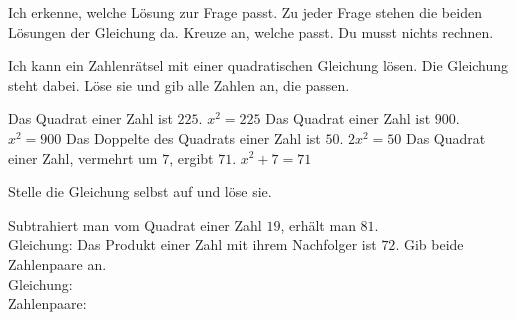 \hypertarget{e3}{}
\renewcommand{\theaufgabe}{\arabic{aufgabe}}\setcounter{aufgabe}{21}

\begin{aufgabe}{Ich erkenne, welche Lösung zur Frage passt. Zu jeder Frage stehen die beiden Lösungen der Gleichung da. Kreuze an, welche passt. Du musst nichts rechnen.}
\begin{geruest}
\end{geruest}
\end{aufgabe}

\begin{aufgabe}{Ich kann ein Zahlenrätsel mit einer quadratischen Gleichung lösen. Die Gleichung steht dabei. Löse sie und gib alle Zahlen an, die passen.}
\begin{teile}
\teil Das Quadrat einer Zahl ist $225$. \quad $x^2 = 225$ \quad {}
\teil Das Quadrat einer Zahl ist $900$. \quad $x^2 = 900$ \quad {}
\teil Das Doppelte des Quadrats einer Zahl ist $50$. \quad $2x^2 = 50$ \quad {}
\teil Das Quadrat einer Zahl, vermehrt um $7$, ergibt $71$. \quad $x^2 + 7 = 71$ \quad {}
\end{teile}
Stelle die Gleichung selbst auf und löse sie.
\begin{teile}
\teil Subtrahiert man vom Quadrat einer Zahl $19$, erhält man $81$.\\ Gleichung: \leerfeld {}
\teil Das Produkt einer Zahl mit ihrem Nachfolger ist $72$. Gib beide Zahlenpaare an.\\ Gleichung: \leerfeld {}\\ Zahlenpaare: \leerfeld \leerfeld
\end{teile}
\end{aufgabe}

